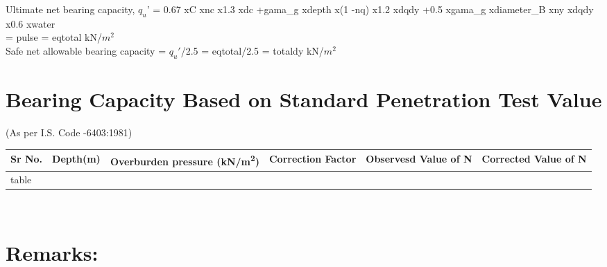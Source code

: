 \documentclass{set}
\begin{document}
Ultimate net bearing capacity, $q_u$' = 0.67 x{{C}} x{{nc}} x1.3 x{{dc}} +{{gama_g}} x{{depth}} x(1 -{{nq}}) x1.2 x{{dqdy}} +0.5 x{{gama_g}} x{{diameter_B}} x{{ny}} x{{dqdy}} x0.6 x{{water}}\\
= {{pulse}} = {{eqtotal}} kN/$m^2$ \\	
Safe net allowable bearing capacity = $q_u'$/2.5 = {{eqtotal}}/2.5 = {{totaldy}} kN/$m^2$

\section{Bearing Capacity Based on Standard Penetration Test Value}
(As per I.S. Code -6403:1981) \\
\hspace{1.1cm}

\begin{tabularx}{\textwidth}{|*{6}{l|}}
\hline
 \multicolumn{1}{|m{1cm}|}{Sr No.} &\multicolumn{1}{m{2cm}|}{Depth(m)} &\multicolumn{1}{m{2.5cm}|}{Overburden pressure (kN/m\textsuperscript{2})}
&\multicolumn{1}{m{2cm}|}{Correction Factor} &\multicolumn{1}{m{2cm}|}{Observesd Value of N} &\multicolumn{1}{m{2.9cm}|}{Corrected Value of N}\\
\hline
{{table}}
\end{tabularx}

\hspace{1cm}

\\

\clearpage
\section{Remarks:}



\end{document}
